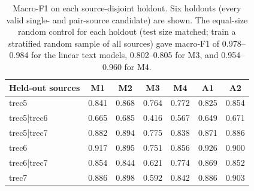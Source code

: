 
\begin{table}[!htbp]
\centering
\caption{Macro-F1 on each source-disjoint holdout. Six holdouts (every valid single- and pair-source candidate) are shown. The equal-size random control for each holdout (test size matched; train a stratified random sample of all sources) gave macro-F1 of 0.978--0.984 for the linear text models, 0.802--0.805 for M3, and 0.954--0.960 for M4.}
\label{tab:holdout}
\begin{tabular}{lcccccc}
\hline\hline
Held-out sources & M1 & M2 & M3 & M4 & A1 & A2 \\
\hline
trec5 & 0.841 & 0.868 & 0.764 & 0.772 & 0.825 & 0.854 \\
trec5|trec6 & 0.665 & 0.685 & 0.416 & 0.567 & 0.649 & 0.671 \\
trec5|trec7 & 0.882 & 0.894 & 0.775 & 0.838 & 0.871 & 0.886 \\
trec6 & 0.917 & 0.895 & 0.751 & 0.856 & 0.926 & 0.900 \\
trec6|trec7 & 0.854 & 0.844 & 0.621 & 0.774 & 0.869 & 0.852 \\
trec7 & 0.886 & 0.898 & 0.592 & 0.842 & 0.886 & 0.903 \\
\hline\hline
\end{tabular}
\end{table}